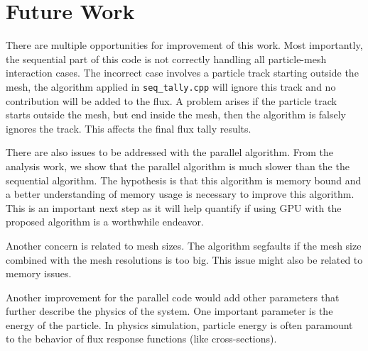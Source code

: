 \section{Future Work}
There are multiple opportunities for improvement of this work. Most importantly, 
the sequential part of this code is not correctly handling all particle-mesh
interaction cases. The incorrect case involves a particle track starting 
outside the mesh, the algorithm applied in \texttt{seq\_tally.cpp} will ignore this 
track and no contribution will be added to the flux.
A problem arises if the particle track starts outside the mesh, but end inside the mesh, 
then the algorithm is falsely ignores the track. This affects the final flux
tally results.

There are also issues to be addressed with the parallel algorithm. 
From the analysis work, we show that the parallel algorithm is much slower than the 
the sequential algorithm. The hypothesis is that this algorithm is memory 
bound and a better understanding of memory usage is necessary to improve 
this algorithm. This is an important next step as it will help quantify if using GPU 
with the proposed algorithm is a worthwhile endeavor.  

Another concern is related to mesh sizes. The algorithm segfaults if the mesh size 
combined with the mesh resolutions is too big. This issue might also be related to 
memory issues.

Another improvement for the parallel code would add other parameters that
further describe the physics of the system. One important parameter is the 
energy of the particle. In physics simulation, particle energy is often
paramount to the behavior of flux response functions (like
cross-sections).

